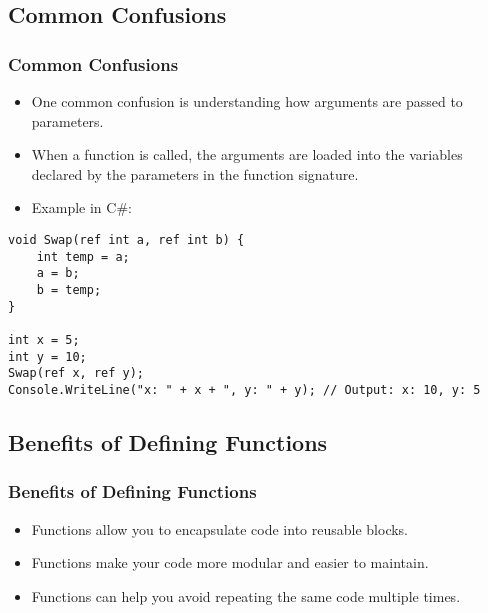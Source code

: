 \subsection{Common Confusions}
\begin{frame}[fragile]
\frametitle{Common Confusions}
\begin{itemize}
    \item One common confusion is understanding how arguments are passed to parameters.
    \item When a function is called, the arguments are loaded into the variables declared by the parameters in the function signature.
    \item Example in C\#:
\end{itemize}
\begin{lstlisting}
void Swap(ref int a, ref int b) {
    int temp = a;
    a = b;
    b = temp;
}

int x = 5;
int y = 10;
Swap(ref x, ref y);
Console.WriteLine("x: " + x + ", y: " + y); // Output: x: 10, y: 5
\end{lstlisting}
\end{frame}

\subsection{Benefits of Defining Functions}
\begin{frame}
\frametitle{Benefits of Defining Functions}
\begin{itemize}
    \item Functions allow you to encapsulate code into reusable blocks.
    \item Functions make your code more modular and easier to maintain.
    \item Functions can help you avoid repeating the same code multiple times.
\end{itemize}
\end{frame}
